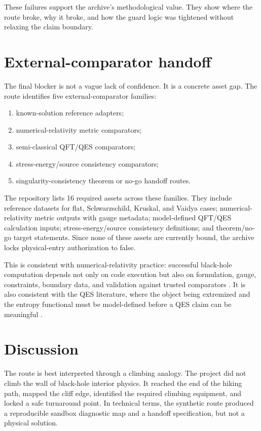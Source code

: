 \documentclass[11pt,a4paper]{article}
\begin{document}
These failures support the archive's methodological value. They show where the route broke, why it broke, and how the guard logic was tightened without relaxing the claim boundary.

\section{External-comparator handoff}

The final blocker is not a vague lack of confidence. It is a concrete asset gap. The route identifies five external-comparator families:

\begin{enumerate}
  \item known-solution reference adapters;
  \item numerical-relativity metric comparators;
  \item semi-classical QFT/QES comparators;
  \item stress-energy/source consistency comparators;
  \item singularity-consistency theorem or no-go handoff routes.
\end{enumerate}

The repository lists 16 required assets across these families. They include reference datasets for flat, Schwarzschild, Kruskal, and Vaidya cases; numerical-relativity metric outputs with gauge metadata; model-defined QFT/QES calculation inputs; stress-energy/source consistency definitions; and theorem/no-go target statements. Since none of these assets are currently bound, the archive locks physical-entry authorization to false.

This is consistent with numerical-relativity practice: successful black-hole computation depends not only on code execution but also on formulation, gauge, constraints, boundary data, and validation against trusted comparators \cite{gourgoulhon2007,pretorius2005,campanelli2006,baker2006}. It is also consistent with the QES literature, where the object being extremized and the entropy functional must be model-defined before a QES claim can be meaningful \cite{ryu2006,engelhardt2015,bousso2022}.

\section{Discussion}

The route is best interpreted through a climbing analogy. The project did not climb the wall of black-hole interior physics. It reached the end of the hiking path, mapped the cliff edge, identified the required climbing equipment, and locked a safe turnaround point. In technical terms, the synthetic route produced a reproducible sandbox diagnostic map and a handoff specification, but not a physical solution.
\end{document}
